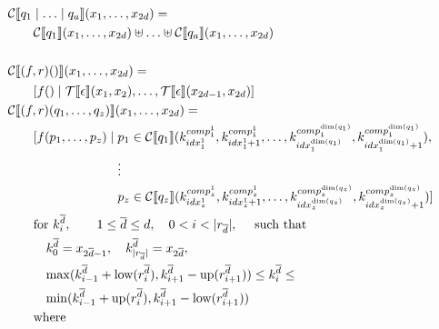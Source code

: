 \documentclass[
    a4paper,
    12pt,
    twoside,
    BCOR=12mm,
    parskip=half,
    chapterprefix,
    numbers=noenddot,
    bibliography=totoc
]{scrbook}
\begin{document}
\begin{align}
	&\mathcal{C}\llbracket q_1 \mid \ldots \mid q_a \rrbracket(x_1,\ldots,x_{2d}) = \label{eq:pat_alternatives} \\
		&\qquad \mathrlap{\mathcal{C}\llbracket q_1 \rrbracket (x_1,\ldots,x_{2d}) \uplus \ldots \uplus \mathcal{C}\llbracket q_a \rrbracket (x_1,\ldots,x_{2d})} \nonumber\\
  \nonumber\\
	&\mathcal{C}\llbracket (f,r)() \rrbracket(x_1,\ldots,x_{2d}) = \label{eq:pat_rule_empty} \\
		&\qquad
			\!\begin{aligned}
			[ f() \mid \; & \mathcal{T}\llbracket \epsilon \rrbracket(x_1,x_2), \ldots, \mathcal{T}\llbracket \epsilon \rrbracket(x_{2d-1},x_{2d})	]
			\end{aligned} \nonumber\\
	&\mathcal{C}\llbracket (f,r)(q_1,\ldots, q_z) \rrbracket(x_1,\ldots,x_{2d}) = \label{eq:pat_rule} \\
		&\qquad
			\!\begin{aligned}
			[ f(p_1,\ldots,p_z) \mid \; &p_1 \in \mathcal{C}\llbracket q_1 \rrbracket (k^{comp^1_1}_{idx^1_1},k^{comp^1_1}_{idx^1_1 + 1},\ldots,k^{comp^{\op{dim}(q_1)}_1}_{idx^{\op{dim}(q_1)}_1}, k^{comp^{\op{dim}(q_1)}_1}_{idx^{\op{dim}(q_1)}_1 + 1}),\\
			&\vdots\\
			&p_z \in \mathcal{C}\llbracket q_z \rrbracket (k^{comp^1_z}_{idx^1_z},k^{comp^1_z}_{idx^1_z + 1},\ldots,k^{comp^{\op{dim}(q_z)}_z}_{idx^{\op{dim}(q_z)}_z},k^{comp^{\op{dim}(q_z)}_z}_{idx^{\op{dim}(q_z)}_z + 1})
			]
			\end{aligned} \nonumber\\
		&\qquad \text{for } k^{\overline{d}}_i, \qquad 1 \leq \overline{d} \leq d, \quad 0 < i < |r_{\overline{d}}|, \quad \text{ such that} \nonumber\\
		&\qquad\quad k^{\overline{d}}_0 = x_{2\overline{d}-1},\quad k^{\overline{d}}_{|r_{\overline{d}}|} = x_{2\overline{d}}, \nonumber\\
		&\qquad\quad 
			\!\max (k^{\overline{d}}_{i-1} + \op{low}(r^{\overline{d}}_i), k^{\overline{d}}_{i+1} - \op{up}(r^{\overline{d}}_{i+1})) 
			\leq k^{\overline{d}}_i \leq \nonumber\\
		&\qquad\quad 
			\!\min (k^{\overline{d}}_{i-1} + \op{up}(r^{\overline{d}}_i), k^{\overline{d}}_{i+1} - \op{low}(r^{\overline{d}}_{i+1})) 
			 \nonumber\\
		&\qquad \text{where} \nonumber\\

\end{align}
\end{document}
